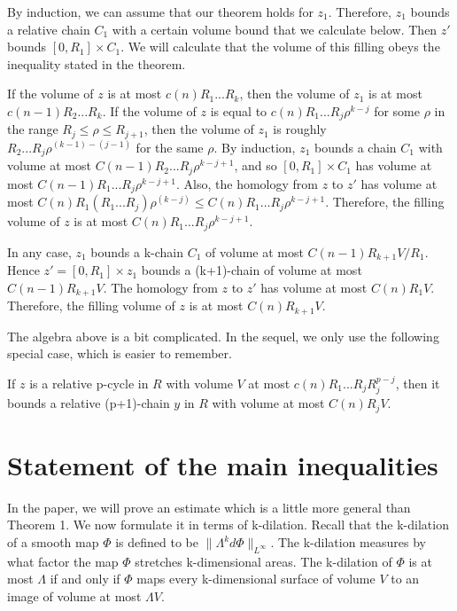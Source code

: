 \documentclass{amsart}
\newtheorem*{Theorem 1}{Theorem 1}
\newtheorem*{Theorem 2}{Theorem 2}
\newtheorem*{Estimate 1}{Estimate 1}
\newtheorem*{Estimate 2}{Estimate 2}
\newtheorem*{key lemma}{Key Lemma}
\numberwithin{equation}{section}
\begin{document}
By induction, we can assume that our theorem holds for $z_1$. 
Therefore, $z_1$ bounds a relative chain $C_1$ with a certain
volume bound that we calculate below.  Then $z'$ bounds $[0, R_1]
\times C_1$.  We will calculate that the volume of this filling
obeys the inequality stated in the theorem.

If the volume of $z$ is at most $c(n) R_1 ... R_k$, then the
volume of $z_1$ is at most $c(n-1) R_2 ... R_k$.  If the volume
of $z$ is equal to $c(n) R_1 ... R_j \rho^{k-j}$ for some $\rho$ in
the range $R_j \le \rho \le R_{j+1}$, then the volume of $z_1$ is
roughly $R_2 ... R_j \rho^{(k-1) - (j-1)}$ for the same $\rho$. 
By induction, $z_1$ bounds a chain $C_1$ with volume at most
$C(n-1) R_2 ... R_j \rho^{k-j+1}$, and so $[0, R_1] \times C_1$
has volume at most $C(n-1) R_1 ... R_j \rho^{k-j+1}$.  Also, the
homology from $z$ to $z'$ has volume at most $C(n) R_1 (R_1 ...
R_j) \rho^{(k-j)} \le C(n) R_1 ... R_j \rho^{k-j+1}$. Therefore,
the filling volume of $z$ is at most $C(n) R_1 ... R_j
\rho^{k-j+1}$.

In any case, $z_1$ bounds a k-chain $C_1$ of volume at most
$C(n-1) R_{k+1} V / R_1$. Hence $z' = [0,R_1] \times z_1$ bounds
a (k+1)-chain of volume at most $C(n-1) R_{k+1} V$.  The homology
from $z$ to $z'$ has volume at most $C(n) R_1 V$.  Therefore, the
filling volume of $z$ is at most $C(n) R_{k+1} V$. \endproof

The algebra above is a bit complicated.  In the sequel, we only
use the following special case, which is easier to remember.

If $z$ is a relative p-cycle in $R$ with volume $V$ at most $c(n)
R_1 ... R_j R_j^{p-j}$, then it bounds a relative (p+1)-chain $y$
in $R$ with volume at most $C(n) R_j V$.


\section{Statement of the main inequalities}

In the paper, we will prove an estimate which is a little more
general than Theorem 1.  We now formulate it in terms of
k-dilation.  Recall that the k-dilation of a smooth map $\Phi$ is
defined to be $\| \Lambda^k d \Phi \|_{L^\infty}$.  The
k-dilation measures by what factor the map $\Phi$ stretches
k-dimensional areas.  The k-dilation of $\Phi$ is at most
$\Lambda$ if and only if $\Phi$ maps every k-dimensional surface
of volume $V$ to an image of volume at most $\Lambda V$.
\end{document}
